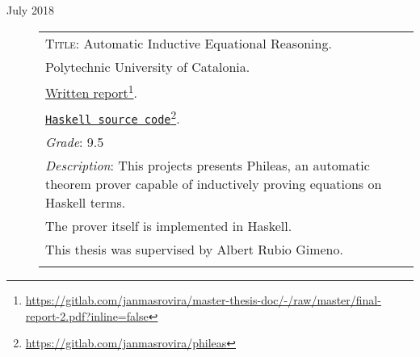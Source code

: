 \documentclass[11pt]{article}
\newcommand{\fnlink}[2]{\href{#1}{#2}\footnote{\url{#1}}}
\begin{document}
\begin{description}
\item[July 2018]
  \begin{minipage}{\textwidth}
    \begin{tabular}{|p{12cm}}
      \textsc{Title}: Automatic Inductive Equational Reasoning. \\
      Polytechnic University of Catalonia. \\
      \fnlink{https://gitlab.com/janmasrovira/master-thesis-doc/-/raw/master/final-report-2.pdf?inline=false}{Written report}. \\
      \fnlink{https://gitlab.com/janmasrovira/phileas}{\texttt{Haskell source code}}. \\
      \textit{Grade}: 9.5 \\
      \textit{Description}: This projects presents Phileas, an automatic
      theorem prover capable of inductively proving equations on Haskell
      terms.
      \\The prover itself is implemented in Haskell.
      \\This thesis was supervised by Albert Rubio Gimeno. \\
      \multicolumn{1}{c}{} \\

    \end{tabular}
  \end{minipage}

\end{description}
\end{document}
